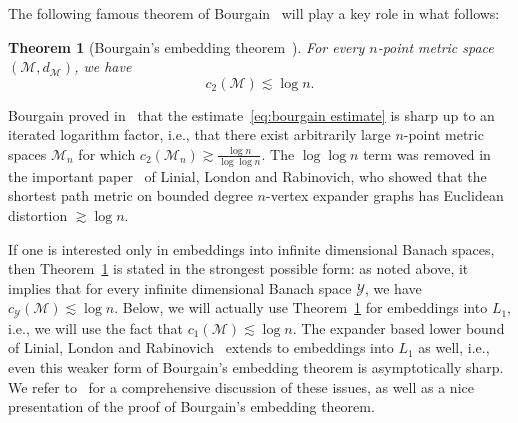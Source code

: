 \documentclass{icm2010}
\newtheorem{theorem}{Theorem}[section]
\theoremstyle{definition}
\newcommand{\1}{\mathbf{1}}
\newcommand{\M}{\mathscr{M}}
\newcommand{\Y}{\mathscr{Y}}
\begin{document}
The following famous theorem of Bourgain~\cite{Bou85} will play a
key role in what follows:
\begin{theorem}[Bourgain's embedding theorem~\cite{Bou85}]\label{thm:bourgain}
For every $n$-point metric space $(\M,d_\M)$, we have
\begin{equation}\label{eq:bourgain estimate}
c_2(\M)\lesssim \log n.
\end{equation}
\end{theorem}
Bourgain proved in~\cite{Bou85} that the estimate~\eqref{eq:bourgain
estimate} is sharp up to an iterated logarithm factor, i.e., that
there exist arbitrarily large $n$-point metric spaces $\M_n$ for
which $c_2(\M_n)\gtrsim \frac{\log n}{\log \log n}$. The $\log\log n$ term was removed in the important paper~\cite{LLR95} of
Linial, London and Rabinovich, who showed that the shortest path
metric on bounded degree $n$-vertex expander graphs has Euclidean
distortion $\gtrsim \log n$.

If one is interested only in embeddings into infinite dimensional
Banach spaces, then Theorem~\ref{thm:bourgain} is stated in the
strongest possible form: as noted above, it implies that for every
infinite dimensional Banach space $\Y$, we have $c_\Y(\M)\lesssim
\log n$. Below, we will actually use Theorem~\ref{thm:bourgain} for
embeddings into $L_1$, i.e., we will use the fact that
$c_1(\M)\lesssim \log n$. The expander based lower bound of Linial,
London and Rabinovich~\cite{LLR95} extends to embeddings into $L_1$
as well, i.e., even this weaker form of Bourgain's embedding theorem
is asymptotically sharp. We refer to~\cite[Ch.\  15]{Mat02} for a
comprehensive discussion of these issues, as well as a nice
presentation of the proof of Bourgain's embedding theorem.
\end{document}
